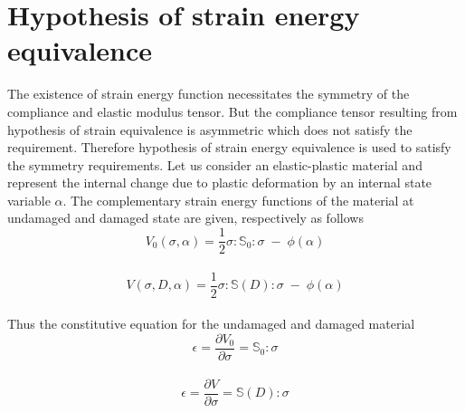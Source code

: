 \documentclass[a4paper,12pt,twoside]{report}
\begin{document}
\section{Hypothesis of strain energy equivalence}\label{Hypothesis of strain energy equivalence}
\indent\indent\indent The existence of strain energy function necessitates the symmetry of the compliance and elastic modulus tensor. But the compliance tensor resulting from hypothesis of strain equivalence is asymmetric which does not satisfy the requirement. Therefore hypothesis of strain energy equivalence is used to satisfy the symmetry requirements. Let us consider an elastic-plastic material and represent the internal change due to plastic deformation by an internal state variable $\alpha$. The complementary strain energy functions of the material at undamaged and damaged state are given, respectively as follows
\\
\begin{equation}
V_{0}(\sigma,\alpha) = \frac{1}{2}\sigma : \mathbb{S}_{0} : \sigma \; - \; \phi(\alpha)
\end{equation}
\\
\begin{equation}
V(\sigma,D,\alpha) = \frac{1}{2}\sigma : \mathbb{S}(D) : \sigma \; - \; \phi(\alpha)
\end{equation}
\\
Thus the constitutive equation for the undamaged and damaged material 
\\
\begin{equation}
\epsilon = \frac{\partial V_{0} }{\partial \sigma} = \mathbb{S}_{0} : \sigma
\end{equation}
\\
\begin{equation}
\epsilon = \frac{\partial V }{\partial \sigma} = \mathbb{S}(D) : \sigma
\label{eqn:Strain_energy_eq}
\end{equation}
\end{document}
